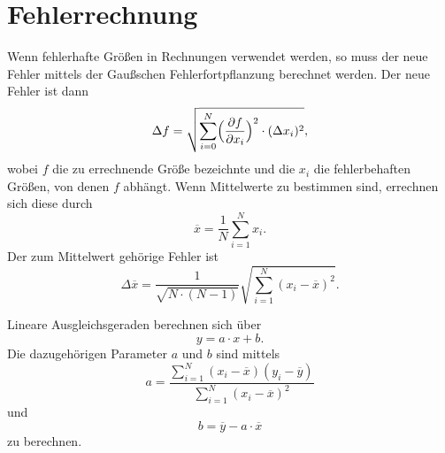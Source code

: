 \section{Fehlerrechnung}
\label{sec:Fehlerrechnung}
Wenn fehlerhafte Größen in Rechnungen verwendet werden, so muss der neue Fehler mittels der Gaußschen Fehlerfortpflanzung berechnet werden. Der neue Fehler ist dann
\begin{equation}
\label{eqt:fehlerfortpflanzung}
\Delta f = \sqrt{\sum_{i=0}^N \Bigl( \frac{\partial f}{\partial x_i} \Bigr) ^2 \cdot (\Delta x_i)^2 },
\end{equation}
wobei $f$ die zu errechnende Größe bezeichnte und die $x_i$ die fehlerbehaften Größen, von denen $f$ abhängt.
Wenn Mittelwerte zu bestimmen sind, errechnen sich diese durch
\begin{equation}
\label{eqt:mittelwert}
\overline{x} = \frac {1} {N} \sum_{i=1}^N x_i.
\end{equation}
Der zum Mittelwert gehörige Fehler ist
\begin{equation}
\label{eqt:FehlerMittelwert}
\Delta \overline{x} = \frac{1}{\sqrt{N \cdot (N-1)}} \sqrt{ \sum_{i=1}^N (x_i - \overline{x})^2}.
\end{equation}

Lineare Ausgleichsgeraden berechnen sich über
\begin{equation}
\label{eqt:Gerade}
y = a \cdot x + b.
\end{equation}
Die dazugehörigen Parameter $a$ und $b$ sind mittels
\begin{equation}
\label{eqt:a}
a = \frac {\sum_{i=1}^N (x_i - \overline{x}) (y_i - \overline{y})}{\sum_{i=1}^N (x_i - \overline{x})^2}
\end{equation}
und
\begin{equation}
\label{eqt:b}
b = \overline{y} - a \cdot \overline{x}
\end{equation}
zu berechnen.